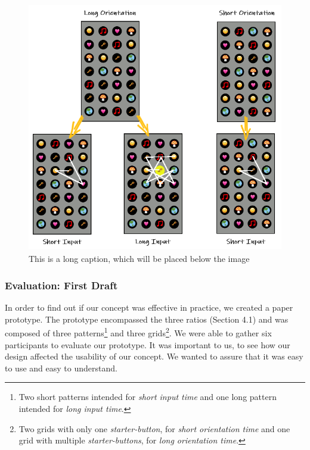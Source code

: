 \begin{figure}[t!]
\centering
\includegraphics[width=14cm, height=11cm]{Chapters/graphics/firstdraft.PNG}
\caption[This is a short caption for the index]{This is a long caption, which will be placed below the image}
\label{fig:firstdraft}
\end{figure}

\subsubsection{Evaluation: First Draft} \label{4.2.2.2}
In order to find out if our concept was effective in practice, we created a paper prototype. The prototype encompassed the three ratios (Section 4.1) and was composed of three patterns\footnote{Two short patterns intended for \textit{short input time} and one long pattern intended for \textit{long input time}.} and three grids\footnote{Two grids with only one \textit{starter-button}, for \textit{short orientation time} and one grid with multiple \textit{starter-buttons}, for \textit{long orientation time}.}. We were able to gather six participants to evaluate our prototype. It was important to us, to see how our design affected the usability of our concept. We wanted to assure that it was easy to use and easy to understand. 

